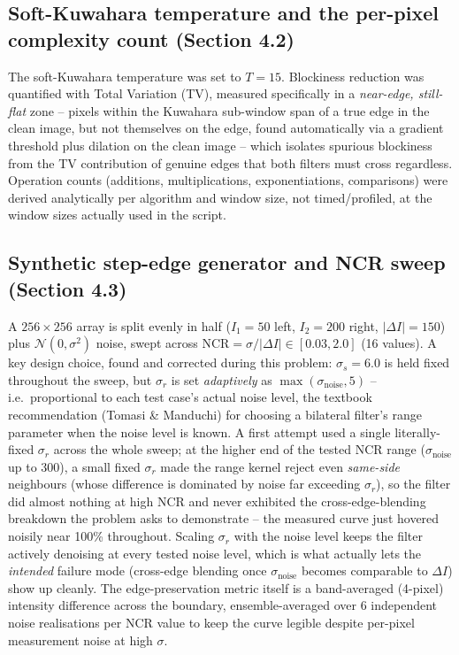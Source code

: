 \documentclass[11pt]{article}
\begin{document}
\subsection{Soft-Kuwahara temperature and the per-pixel complexity count (Section 4.2)}

The soft-Kuwahara temperature was set to $T=15$. Blockiness reduction was quantified
with Total Variation (TV), measured specifically in a \emph{near-edge, still-flat} zone
-- pixels within the Kuwahara sub-window span of a true edge in the clean image, but not
themselves on the edge, found automatically via a gradient threshold plus dilation on
the clean image -- which isolates spurious blockiness from the TV contribution of
genuine edges that both filters must cross regardless. Operation counts (additions,
multiplications, exponentiations, comparisons) were derived analytically per algorithm
and window size, not timed/profiled, at the window sizes actually used in the script.

\subsection{Synthetic step-edge generator and NCR sweep (Section 4.3)}

A $256\times 256$ array is split evenly in half ($I_1=50$ left, $I_2=200$ right,
$|\Delta I|=150$) plus $\mathcal{N}(0,\sigma^2)$ noise, swept across
$\text{NCR}=\sigma/|\Delta I|\in[0.03,2.0]$ (16 values). A key design choice, found and
corrected during this problem: $\sigma_s=6.0$ is held fixed throughout the sweep, but
$\sigma_r$ is set \emph{adaptively} as $\max(\sigma_{\text{noise}},5)$ -- i.e.\
proportional to each test case's actual noise level, the textbook recommendation
(Tomasi \& Manduchi) for choosing a bilateral filter's range parameter when the noise
level is known. A first attempt used a single literally-fixed $\sigma_r$ across the
whole sweep; at the higher end of the tested NCR range ($\sigma_{\text{noise}}$ up to
300), a small fixed $\sigma_r$ made the range kernel reject even \emph{same-side}
neighbours (whose difference is dominated by noise far exceeding $\sigma_r$), so the
filter did almost nothing at high NCR and never exhibited the cross-edge-blending
breakdown the problem asks to demonstrate -- the measured curve just hovered noisily
near 100\% throughout. Scaling $\sigma_r$ with the noise level keeps the filter actively
denoising at every tested noise level, which is what actually lets the \emph{intended}
failure mode (cross-edge blending once $\sigma_{\text{noise}}$ becomes comparable to
$\Delta I$) show up cleanly. The edge-preservation metric itself is a band-averaged
(4-pixel) intensity difference across the boundary, ensemble-averaged over 6 independent
noise realisations per NCR value to keep the curve legible despite per-pixel measurement
noise at high $\sigma$.
\end{document}
